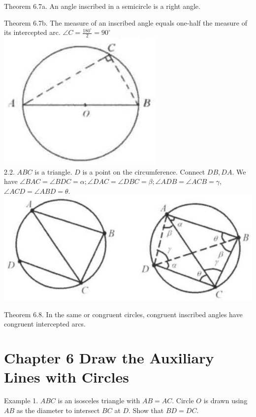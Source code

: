 \documentclass[10pt]{article}
\begin{document}
Theorem 6.7a. An angle inscribed in a semicircle is a right angle.

Theorem 6.7b. The measure of an inscribed angle equals one-half the measure of its intercepted arc. \(\angle C=\frac{180^{\circ}}{2}=90^{\circ}\)\\
\includegraphics[max width=\textwidth, center]{2025_04_17_97bc1f7e44d93c271a88g-162}\\
2.2. \(A B C\) is a triangle. \(D\) is a point on the circumference. Connect \(D B, D A\). We have \(\angle B A C=\angle B D C=\alpha ; \angle D A C=\angle D B C=\beta ; \angle A D B=\angle A C B=\gamma\), \(\angle A C D=\angle A B D=\theta\).\\
\includegraphics[max width=\textwidth, center]{2025_04_17_97bc1f7e44d93c271a88g-162(2)}

Theorem 6.8. In the same or congruent circles, congruent inscribed angles have congruent intercepted arcs.

\section*{Chapter 6 Draw the Auxiliary Lines with Circles}
Example 1. \(A B C\) is an isosceles triangle with \(A B=A C\). Circle \(O\) is drawn using \(A B\) as the diameter to intersect \(B C\) at \(D\). Show that \(B D=D C\).
\end{document}
